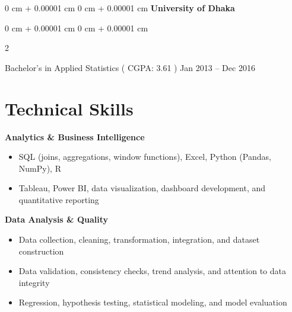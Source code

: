 \documentclass[10pt, letterpaper]{article}
\newenvironment{highlights}{
    \begin{itemize}[
        topsep=0.10 cm,
        parsep=0.10 cm,
        partopsep=0pt,
        itemsep=0pt,
        leftmargin=0 cm + 10pt
    ]
}{
    \end{itemize}
} %
\newenvironment{onecolentry}{
    \begin{adjustwidth}{
        0 cm + 0.00001 cm
    }{
        0 cm + 0.00001 cm
    }
}{
    \end{adjustwidth}
} %
\newenvironment{twocolentry}[2][]{
    \onecolentry
    \def\secondColumn{#2}
    \setcolumnwidth{\fill, 4.5 cm}
    \begin{paracol}{2}
}{
    \switchcolumn \raggedleft \secondColumn
    \end{paracol}
    \endonecolentry
} %
\begin{document}
            \vspace{0.20 cm}
     \begin{onecolentry}{
    \textbf{University of Dhaka}
    }
    \end{onecolentry}        
    \begin{twocolentry}{
            Jan 2013 – Dec 2016
        }
            Bachelor's in Applied Statistics ( CGPA: 3.61 )\end{twocolentry}
        \vspace{0.10 cm}


\section*{Technical Skills}

\textbf{Analytics \& Business Intelligence}
\begin{itemize}
    \item SQL (joins, aggregations, window functions), Excel, Python (Pandas, NumPy), R
    \item Tableau, Power BI, data visualization, dashboard development, and quantitative reporting
\end{itemize}

\textbf{Data Analysis \& Quality}
\begin{itemize}
    \item Data collection, cleaning, transformation, integration, and dataset construction
    \item Data validation, consistency checks, trend analysis, and attention to data integrity
    \item Regression, hypothesis testing, statistical modeling, and model evaluation
\end{itemize}
\end{document}
